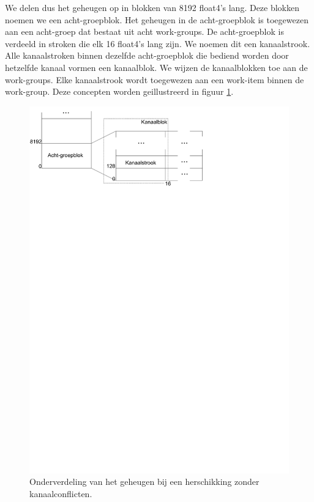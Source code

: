 We delen dus het geheugen op in blokken van 8192 float4's lang. Deze blokken noemen we een acht-groepblok. Het geheugen in de acht-groepblok is toegewezen aan een acht-groep dat bestaat uit acht work-groups. De acht-groepblok is verdeeld in stroken die elk 16 float4's lang zijn. We noemen dit een kanaalstrook. Alle kanaalstroken binnen dezelfde acht-groepblok die bediend worden door hetzelfde kanaal vormen een kanaalblok. We wijzen de kanaalblokken toe aan de work-groups. Elke kanaalstrook wordt toegewezen aan een work-item binnen de work-group. Deze concepten worden geillustreerd in figuur \ref{iso}.

\begin{figure}
\centering
\includegraphics[trim=0 23cm 6.5cm 0, clip]{iso}
\caption{\label{iso}Onderverdeling van het geheugen bij een herschikking zonder kanaalconflicten.}
\end{figure}

